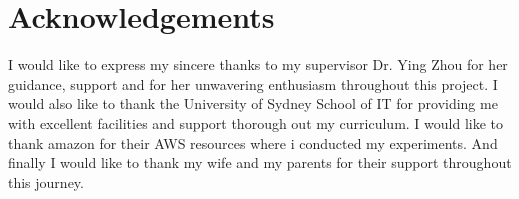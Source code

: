 \chapter*{Acknowledgements}

I would like to express my sincere thanks to my supervisor Dr. Ying
Zhou for her guidance, support and for her unwavering enthusiasm throughout
this project. I would also like to thank the University of Sydney School of IT for providing me
with excellent facilities and support thorough out my curriculum. I
would like to thank amazon for their AWS resources where i conducted
my experiments. And finally I  would like to thank my wife and my
parents for their support throughout this journey.
